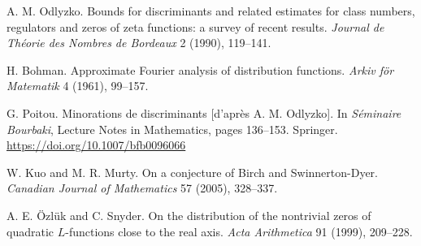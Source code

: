 

 A. M. Odlyzko. Bounds for discriminants and related estimates for class numbers, regulators and zeros of zeta functions: a survey of recent results. \emph{Journal de Th\'eorie des Nombres de Bordeaux} 2 (1990), 119--141.

 H. Bohman. Approximate Fourier analysis of distribution functions. \emph{Arkiv f\"or Matematik} 4 (1961), 99--157.

 G. Poitou. Minorations de discriminants [d'apr\`es A. M. Odlyzko]. In \emph{S\'eminaire Bourbaki}, Lecture Notes in Mathematics, pages 136--153. Springer. \url{https://doi.org/10.1007/bfb0096066}

 W. Kuo and M. R. Murty. On a conjecture of Birch and Swinnerton-Dyer. \emph{Canadian Journal of Mathematics} 57 (2005), 328--337.

 A. E. \"Ozl\"uk and C. Snyder. On the distribution of the nontrivial zeros of quadratic $L$-functions close to the real axis. \emph{Acta Arithmetica} 91 (1999), 209--228.


